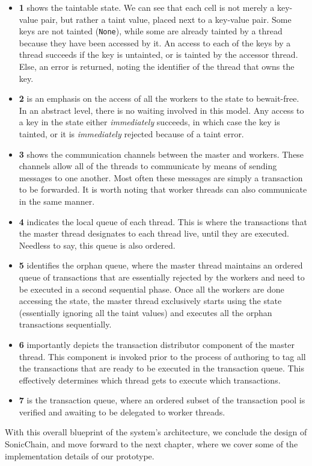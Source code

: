 \begin{itemize}
	\item \textbf{1} shows the taintable state. We can see that each cell is not merely a key-value
	pair, but rather a taint value, placed next to a key-value pair. Some keys are not tainted
	(\texttt{None}), while some are already tainted by a thread because they have been accessed by
	it. An access to each of the keys by a thread succeeds if the key is untainted, or is
	tainted by the accessor thread. Else, an error is returned, noting the identifier of the thread
	that owns the key.
	\item \textbf{2} is an emphasis on the access of all the workers to the state to bewait-free. In an abstract
	level, there is no waiting involved in this model. Any access to a key in the state either
	\textit{immediately} succeeds, in which case the key is tainted, or it is
	\textit{immediately} rejected because of a taint error.
	\item \textbf{3} shows the communication channels between the master and workers. These channels
	allow all of the threads to communicate by means of sending messages to one another. Most
	often these messages are simply a transaction to be forwarded. It is worth noting that worker
	threads can also communicate in the same manner.
	\item \textbf{4} indicates the local queue of each thread. This is where the transactions that the
	master thread designates to each thread live, until they are executed. Needless to say, this
	queue is also ordered.
	\item \textbf{5} identifies the orphan queue, where the master thread maintains an ordered queue of
	transactions that are essentially rejected by the workers and need to be executed in a second
	sequential phase. Once all the workers are done accessing the state, the master thread
	exclusively starts using the state (essentially ignoring all the taint values) and executes
	all the orphan transactions sequentially.
	\item \textbf{6} importantly depicts the transaction distributor component of the master thread.
	This component is invoked prior to the process of authoring to tag all the transactions that are
	ready to be executed in the transaction queue. This effectively determines which thread gets to
	execute which transactions.
	\item \textbf{7} is the transaction queue, where an ordered subset of the transaction pool is
	verified and awaiting to be delegated to worker threads.
\end{itemize}

With this overall blueprint of the system's architecture, we conclude the design of SonicChain, and move forward to the next chapter, where
we cover some of the implementation details of our prototype.






